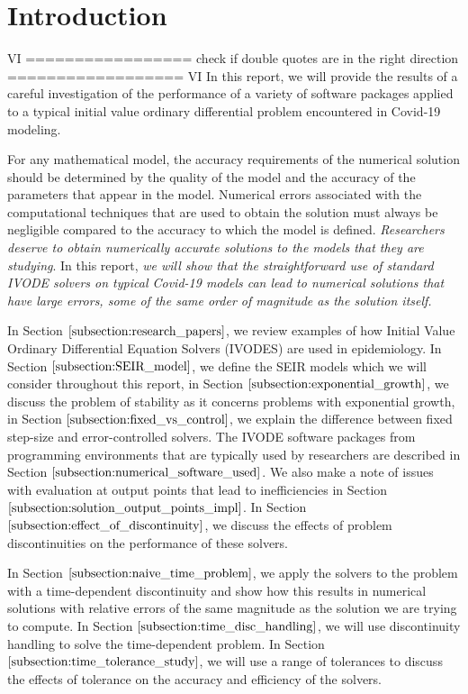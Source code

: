 
\section{Introduction}
\label{section:intro}
VI =================
check if double quotes are in the right direction
================== VI
In this report, we will provide the results of a careful investigation of the performance of a variety of software packages applied to a typical initial value ordinary differential problem encountered in Covid-19 modeling. 

For any mathematical model, the accuracy requirements of the numerical solution should be determined by the quality of the model and the accuracy of the parameters that appear in the model. Numerical errors associated with the computational techniques that are used to obtain the solution must always be negligible compared to the accuracy to which the model is defined. \emph{Researchers deserve to obtain numerically accurate solutions to the models that they are studying}. In this report, \emph{we will show that the straightforward use of standard IVODE solvers on typical Covid-19 models can lead to numerical solutions that have large errors, some of the same order of magnitude as the solution itself.}

In Section $\ref{subsection:research_papers}$, we review examples of how Initial Value Ordinary Differential Equation Solvers (IVODES) are used in epidemiology. In Section $\ref{subsection:SEIR_model}$, we define the SEIR models which we will consider throughout this report, in Section $\ref{subsection:exponential_growth}$, we discuss the problem of stability as it concerns problems with exponential growth, in Section $\ref{subsection:fixed_vs_control}$, we explain the difference between fixed step-size and error-controlled solvers. The IVODE software packages from programming environments that are typically used by researchers are described in Section $\ref{subsection:numerical_software_used}$. We also make a note of issues with evaluation at output points that lead to inefficiencies in Section $\ref{subsection:solution_output_points_impl}$. In Section $\ref{subsection:effect_of_discontinuity}$, we discuss the effects of problem discontinuities on the performance of these solvers.

In Section $\ref{subsection:naive_time_problem}$, we apply the solvers to the problem with a time-dependent discontinuity and show how this results in numerical solutions with relative errors of the same magnitude as the solution we are trying to compute. In Section $\ref{subsection:time_disc_handling}$, we will use discontinuity handling to solve the time-dependent problem. In Section $\ref{subsection:time_tolerance_study}$, we will use a range of tolerances to discuss the effects of tolerance on the accuracy and efficiency of the solvers.

